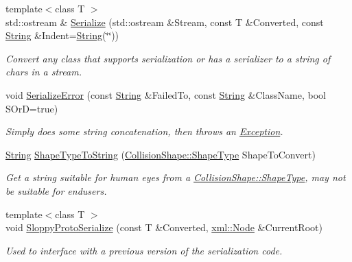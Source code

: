 \begin{DoxyCompactItemize}
\item 
{\footnotesize template$<$class T $>$ }\\std::ostream \& \hyperlink{namespaceMezzanine_a21d2dc7a6ca76ae9b193118a215ba523}{Serialize} (std::ostream \&Stream, const T \&Converted, const \hyperlink{namespaceMezzanine_acf9fcc130e6ebf08e3d8491aebcf1c86}{String} \&Indent=\hyperlink{namespaceMezzanine_acf9fcc130e6ebf08e3d8491aebcf1c86}{String}(\char`\"{}\char`\"{}))
\begin{DoxyCompactList}\small\item\em Convert any class that supports serialization or has a serializer to a string of chars in a stream. \item\end{DoxyCompactList}\item 
void \hyperlink{namespaceMezzanine_ab061665515c8e8a8b09ee54d93612da1}{SerializeError} (const \hyperlink{namespaceMezzanine_acf9fcc130e6ebf08e3d8491aebcf1c86}{String} \&FailedTo, const \hyperlink{namespaceMezzanine_acf9fcc130e6ebf08e3d8491aebcf1c86}{String} \&ClassName, bool SOrD=true)
\begin{DoxyCompactList}\small\item\em Simply does some string concatenation, then throws an \hyperlink{classMezzanine_1_1Exception}{Exception}. \item\end{DoxyCompactList}\item 
\hyperlink{namespaceMezzanine_acf9fcc130e6ebf08e3d8491aebcf1c86}{String} \hyperlink{namespaceMezzanine_a52369c62b87ecdbfbc6b82a572f21651}{ShapeTypeToString} (\hyperlink{classMezzanine_1_1CollisionShape_ad04186055565998879b64176d6dd100d}{CollisionShape::ShapeType} ShapeToConvert)
\begin{DoxyCompactList}\small\item\em Get a string suitable for human eyes from a \hyperlink{classMezzanine_1_1CollisionShape_ad04186055565998879b64176d6dd100d}{CollisionShape::ShapeType}, may not be suitable for endusers. \item\end{DoxyCompactList}\item 
{\footnotesize template$<$class T $>$ }\\void \hyperlink{namespaceMezzanine_ab855b02f8aecd53b0f876e20d6f04f05}{SloppyProtoSerialize} (const T \&Converted, \hyperlink{classMezzanine_1_1xml_1_1Node}{xml::Node} \&CurrentRoot)
\begin{DoxyCompactList}\small\item\em Used to interface with a previous version of the serialization code. \item\end{DoxyCompactList}\item 

\end{DoxyCompactItemize}
